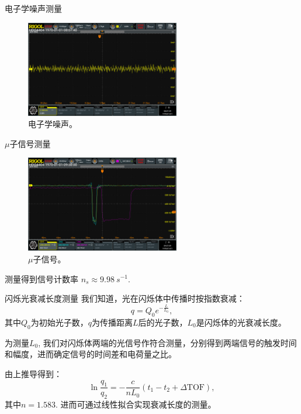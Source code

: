 \documentclass[10pt]{beamer}
\begin{document}
\begin{frame}[label={sec:org7d2cd88}]{电子学噪声测量}
\begin{figure}[htbp]
\centering
\includegraphics[width=0.6\textwidth]{../ExperimentData/figs/elenoise0.png}
\caption{电子学噪声。}
\end{figure}
\end{frame}
\begin{frame}[label={sec:org9e0e478}]{\(\mu\)子信号测量}
\begin{figure}[htbp]
\centering
\includegraphics[width=0.6\textwidth]{../ExperimentData/figs/musignal0.png}
\caption{\(\mu\)子信号。}
\end{figure}

测量得到信号计数率 \(n_s \approx \qty{9.98}{s^{-1}}\).
\end{frame}
\begin{frame}[label={sec:org830efa8}]{闪烁光衰减长度测量}
我们知道，光在闪烁体中传播时按指数衰减：
\begin{equation}
\label{eq:1}
q = Q_0 e^{-\frac{L}{L_0}},
\end{equation}
其中\(Q_0\)为初始光子数，\(q\)为传播距离\(L\)后的光子数，\(L_0\)是闪烁体的光衰减长度。

为测量\(L_0\), 我们对闪烁体两端的光信号作符合测量，分别得到两端信号的触发时间和幅度，进而确定信号的时间差和电荷量之比。

由上推导得到：
\begin{equation}
\label{eq:2}
\ln \frac{q_1}{q_2} = -\frac{c}{nL_0}(t_1 - t_2+\Delta \mathrm{TOF}),
\end{equation}
其中\(n=1.583\). 进而可通过线性拟合实现衰减长度的测量。
\end{frame}
\end{document}
